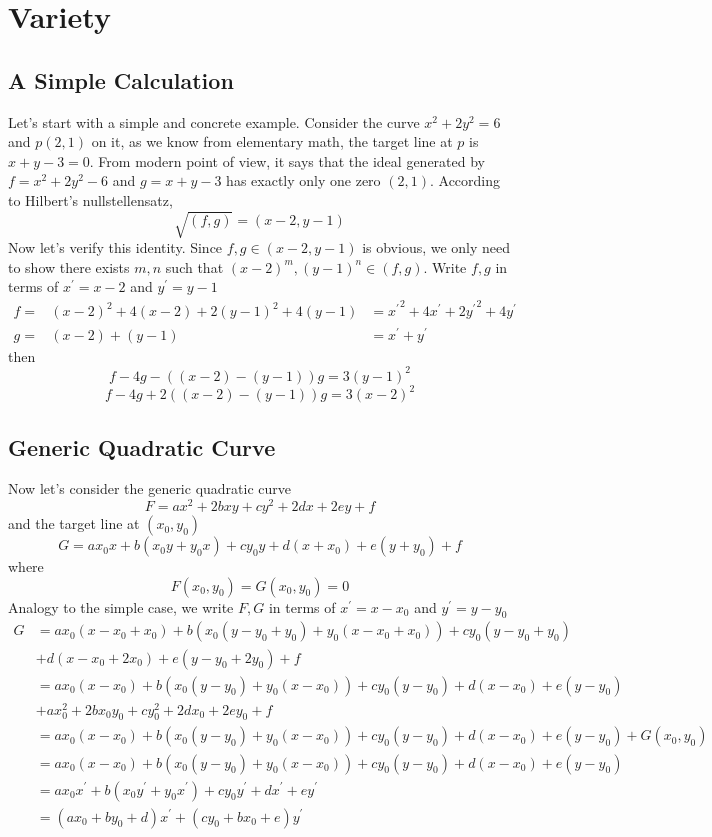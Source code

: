 \documentclass{article}
\begin{document}
\section{Variety}
\subsection{A Simple Calculation}
Let's start with a simple and concrete example. 
Consider the curve $x^2 + 2y^2 = 6$ and $p(2, 1)$ on it, 
as we know from elementary math, the target line at $p$
is $x + y - 3 = 0$.
From modern point of view, it says that the ideal generated
by $f = x^2 + 2y^2 - 6$ and $g = x + y - 3$ has exactly only one zero $(2, 1)$.
According to Hilbert's nullstellensatz, 
$$\sqrt{(f, g)} = (x - 2, y - 1)$$
Now let's verify this identity.
Since $f, g \in (x - 2, y - 1)$ is obvious, 
we only need to show there exists $m, n$ such that
$(x - 2)^m, (y - 1)^n \in (f, g)$.
Write $f, g$ in terms of $x^\prime = x - 2$ and $y^\prime = y - 1$
\begin{align*}
f = & (x - 2)^2 + 4(x - 2) + 2(y-1)^2 + 4(y - 1) & = {x^\prime}^2 + 4x^\prime + 2{y^\prime}^2 + 4y^\prime \\
g = & (x - 2) + (y - 1)                          & = x^\prime + y^\prime
\end{align*}
then 
$$f - 4g - ((x - 2) - (y - 1)) g = 3(y - 1)^2$$
$$f - 4g + 2((x - 2) - (y - 1)) g = 3(x - 2)^2$$

\subsection{Generic Quadratic Curve}
Now let's consider the generic quadratic curve
$$F = ax^2 + 2bxy + cy^2 + 2dx + 2ey + f$$
and the target line at $(x_0, y_0)$
$$G = ax_0x + b(x_0y + y_0x) + cy_0y + d(x + x_0) + e(y + y_0) + f$$
where
$$F(x_0, y_0) = G(x_0, y_0) = 0$$
Analogy to the simple case, we write $F, G$ in terms of $x^\prime = x - x_0$ and $y^\prime = y - y_0$
\begin{align*}
G &= ax_0(x - x_0 + x_0) + b(x_0(y - y_0 + y_0) + y_0(x - x_0 + x_0)) + cy_0(y - y_0 + y_0) \\
  &+ d(x - x_0 + 2x_0) + e(y - y_0 + 2y_0) + f \\
  &= ax_0(x - x_0) + b(x_0(y - y_0) + y_0(x - x_0)) + cy_0(y-y_0) + d(x - x_0) + e(y - y_0) \\
  &+ ax_0^2 + 2bx_0y_0 + cy_0^2 + 2dx_0 + 2ey_0 + f \\
  &= ax_0(x - x_0) + b(x_0(y - y_0) + y_0(x - x_0)) + cy_0(y-y_0) + d(x - x_0) + e(y - y_0) + G(x_0, y_0) \\
  &= ax_0(x - x_0) + b(x_0(y - y_0) + y_0(x - x_0)) + cy_0(y-y_0) + d(x - x_0) + e(y - y_0) \\
  &= ax_0x^\prime + b(x_0y^\prime + y_0x^\prime) + cy_0y^\prime + dx^\prime + ey^\prime \\
  &= (ax_0 + by_0 + d) x^\prime + (cy_0 + bx_0 + e) y^\prime
\end{align*}
\end{document}
